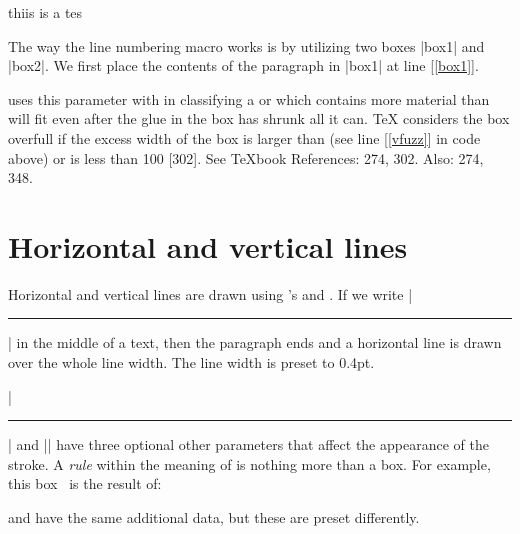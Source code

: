 \begin{teX}
{\footnotesize \the\baselineskip}



thiis is a tes \par


\NumberParagraph{\lipsum[2]}

\bigskip

The way the line numbering macro works is by utilizing two boxes |box1| and |box2|. We first place the contents of the paragraph in |box1| at line [\ref{box1}]. 



\tex uses this parameter with  in classifying a  or  which contains more material than will fit even after the glue in the box has shrunk all it can. TeX considers the box overfull if the excess width of the box is larger than  (see line [\ref{vfuzz}] in code above) or  is less than 100 [302].
See TeXbook References: 274, 302. Also: 274, 348.

\section{Horizontal and vertical lines}
\normalfont\normalsize

Horizontal and vertical lines are drawn using \tex's  and .
If we write |\hrule| in the  middle of a text, then the paragraph ends and
a horizontal line is drawn over the whole line width. The line width is preset to 0.4pt.

|\hrule| and |\vrule| have three optional other parameters that affect the appearance
of the stroke. A \textit{rule} within the meaning of \tex  is nothing more than a
box. For example, this box \vrule height4pt width3pt depth1pt ~is the result of:

\begin{teX}
\vrule height4pt width3pt  depth1pt 
\end{teX}




 and  have the same additional data, but these are preset
differently.

{

\centering\scalebox{3}{\vrule\,Sample} \scalebox{3}{\vrule\,Subtle}

}

\begin{teX}
  \centering\scalebox{3}{\vrule ~Sample} \scalebox{3}{\vrule  ~Subtle}
\end{teX}


\end{teX}
